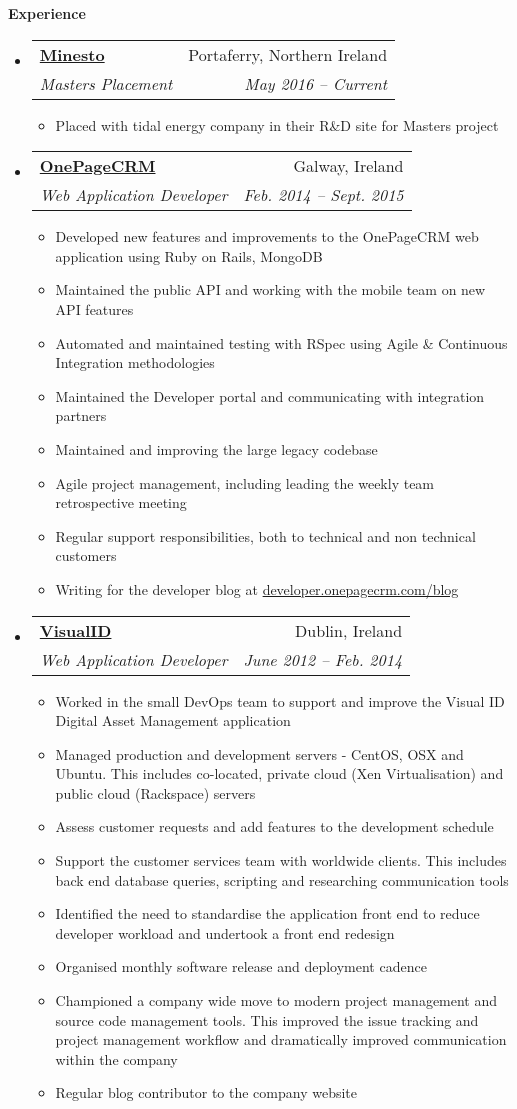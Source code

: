 \documentclass[letterpaper,11pt]{article}
\makeatletter
\newcommand{\resitem}[1]{\item #1 \vspace{-2pt}}
\newcommand{\resheading}[1]{{\large \colorbox{mygrey}{\begin{minipage}{\textwidth}{\textbf{#1 \vphantom{p\^{E}}}}\end{minipage}}}}
\newcommand{\ressubheading}[4]{
\begin{tabular*}{6.5in}{l@{\extracolsep{\fill}}r}
		\textbf{#1} & #2 \\
		\textit{#3} & \textit{#4} \\
\end{tabular*}\vspace{-6pt}}
\makeatother
\begin{document}
\resheading{Experience}
  \begin{itemize}

  \item 
      \ressubheading{\href{http://www.minesto.com}{Minesto}}{Portaferry, Northern Ireland}
        {Masters Placement}{May 2016 -- Current}
        { \footnotesize
        \begin{itemize}
          \resitem{Placed with tidal energy company in their R\&D site for Masters project}
        \end{itemize}
        }
    \item 
      \ressubheading{\href{http://www.onepagecrm.com}{OnePageCRM}}{Galway, Ireland}
        {Web Application Developer}{Feb. 2014 -- Sept. 2015}
        { \footnotesize
        \begin{itemize}
          \resitem{Developed new features and improvements to the OnePageCRM web application using Ruby on Rails, MongoDB}
          \resitem{Maintained the public API and working with the mobile team on new API features}
          \resitem{Automated and maintained testing with RSpec using Agile \& Continuous Integration methodologies}
          \resitem{Maintained the Developer portal and communicating with integration partners}
          \resitem{Maintained and improving the large legacy codebase}
          \resitem{Agile project management, including leading the weekly team retrospective meeting}
          \resitem{Regular support responsibilities, both to technical and non technical customers}
          \resitem{Writing for the developer blog at \href{http://developer.onepagecrm.com/blog}{developer.onepagecrm.com/blog}}
        \end{itemize}
        }

      \item 
      \ressubheading{\href{http://visualid.com}{VisualID}}{Dublin, Ireland}{Web Application Developer}{June 2012 -- Feb. 2014}
        { \footnotesize
        \begin{itemize}
          \resitem{Worked in the small DevOps team to support and improve the Visual ID Digital Asset Management application}
          \resitem{Managed production and development servers - CentOS, OSX and Ubuntu. This includes co-located, private cloud (Xen Virtualisation) and public cloud (Rackspace) servers}
          \resitem{Assess customer requests and add features to the development schedule}
          \resitem{Support the customer services team with worldwide clients. This includes back end database queries, scripting and researching communication tools}
          \resitem{Identified the need to standardise the application front end to reduce developer workload and undertook a front end redesign}
          \resitem{Organised monthly software release and deployment cadence}
          \resitem{Championed a company wide move to modern project management and source code management tools. This improved the issue tracking and project management workflow and dramatically improved communication within the company}
          \resitem{Regular blog contributor to the company website}
        \end{itemize}
        }
        

\end{itemize}
\end{document}
